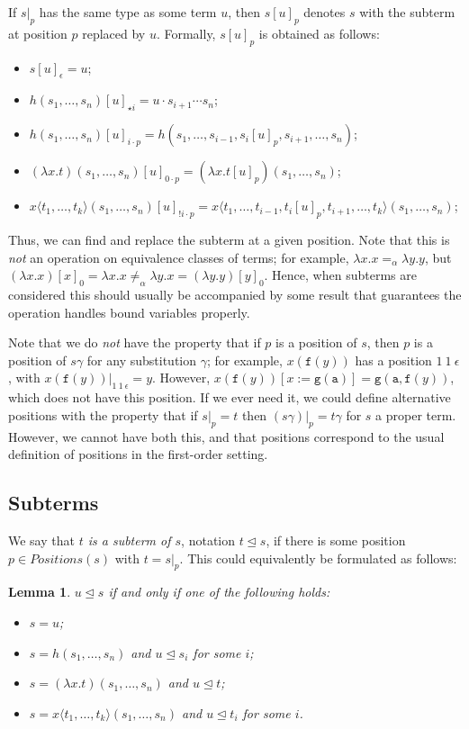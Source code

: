 \documentclass{lmcs}
\theoremstyle{theorem}\newtheorem{theorem}{Theorem}
\theoremstyle{theorem}\newtheorem{lemma}[theorem]{Lemma}
\theoremstyle{theorem}\newtheorem{corollary}[theorem]{Corollary}
\theoremstyle{definition}\newtheorem{definition}[theorem]{Definition}
\theoremstyle{definition}\newtheorem{example}[theorem]{Example}
\newcommand{\Positions}{\mathit{Positions}}
\newcommand{\identifier}[1]{\mathtt{#1}}
\newcommand{\afun}{\identifier{f}}
\newcommand{\bfun}{\identifier{g}}
\newcommand{\avar}{x}
\newcommand{\abs}[2]{\lambda #1.#2}
\newcommand{\meta}[2]{#1\langle#2\rangle}
\newcommand{\subtermeq}{\unlhd}
\begin{document}
If $s|_p$ has the same type as some term $u$, then $s[u]_p$ denotes $s$ with the subterm at position
$p$ replaced by $u$.  Formally, $s[u]_p$ is obtained as follows:
\begin{itemize}
\item $s[u]_\epsilon = u$;
\item $h(s_1,\dots,s_n)[u]_{\star i} = u \cdot s_{i+1} \cdots s_n$;
\item $h(s_1,\dots,s_n)[u]_{i \cdot p} = h(s_1,\dots,s_{i-1},s_i[u]_p,s_{i+1},\dots,s_n)$;
\item $(\abs{\avar}{t})(s_1,\dots,s_n)[u]_{0 \cdot p} = (\abs{\avar}{t[u]_p})(s_1,\dots,s_n)$;
\item $\meta{x}{t_1,\dots,t_k}(s_1,\dots,s_n)[u]_{!i \cdot p} = \meta{x}{t_1,\dots,t_{i-1},t_i[u]_p,t_{i+1},\dots,t_k}(s_1,\dots,s_n)$;
\end{itemize}
Thus, we can find and replace the subterm at a given position.
Note that this is \emph{not} an operation on equivalence classes of terms; for example,
$\abs{x}{x} =_\alpha \abs{y}{y}$, but $(\abs{x}{x})[x]_0 = \abs{x}{x} \not =_\alpha
\abs{y}{x} = (\abs{y}{y})[y]_0$.  Hence, when subterms are considered this should usually be
accompanied by some result that guarantees the operation handles bound variables properly.

Note that we do \emph{not} have the property that if $p$ is a position of $s$, then $p$ is a
position of $s\gamma$ for any substitution $\gamma$; for example, $x(\afun(y))$ has a position
$1\ 1\ \epsilon$, with $x(\afun(y))|_{1\ 1\ \epsilon} = y$.  However,
$x(\afun(y))[x:=\bfun(\identifier{a})] = \bfun(\identifier{a},\afun(y))$, which does not have this
position.  If we ever need it, we could define alternative positions with the property that
if $s|_p = t$ then $(s\gamma)|_p = t\gamma$ for $s$ a proper term.  However, we cannot have both
this, and that positions correspond to the usual definition of positions in the first-order setting.

\subsection{Subterms}

We say that \emph{$t$ is a subterm of $s$}, notation $t \subtermeq s$, if there is some position
$p \in \Positions(s)$ with $t = s|_p$.  This could equivalently be formulated as follows:

\begin{lemma}
$u \subtermeq s$ if and only if one of the following holds:
\begin{itemize}
\item $s = u$;
\item $s = h(s_1,\dots,s_n)$ and $u \subtermeq s_i$ for some $i$;
\item $s = (\abs{x}{t})(s_1,\dots,s_n)$ and $u \subtermeq t$;
\item $s = \meta{x}{t_1,\dots,t_k}(s_1,\dots,s_n)$ and $u \subtermeq t_i$ for some $i$.
\end{itemize}
\end{lemma}
\end{document}
